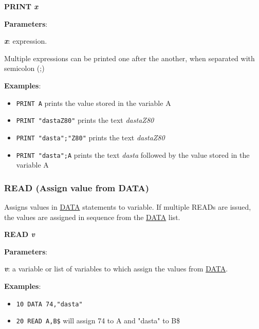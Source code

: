     \hspace{1.9cm}\textbf{PRINT \textit{x}}

    \textbf{Parameters}:

    \hspace{1cm}\textbf{\textit{x}}: expression.

    Multiple expressions can be printed one after the another, when separated
    with semicolon (;)

    \textbf{Examples}:
    \begin{itemize}
        \item \texttt{PRINT A} prints the value stored in the variable A
        \item \texttt{PRINT "dastaZ80"} prints the text \textit{dastaZ80}
        \item \texttt{PRINT "dasta";"Z80"} prints the text \textit{dastaZ80}
        \item \texttt{PRINT "dasta";A} prints the text \textit{dasta} followed
        by the value stored in the variable A
    \end{itemize}

    \subsubsection{{READ (Assign value from DATA)}}
    \label{msbasic:lang:read}
    Assigns values in \hyperref[msbasic:lang:data]{DATA} statements to variable.
    If multiple READs are issued, the values are assigned in sequence from the
    \hyperref[msbasic:lang:data]{DATA} list.

    \hspace{1.9cm}\textbf{READ \textit{v}}

    \textbf{Parameters}:

    \hspace{1cm}\textbf{\textit{v}}: a variable or list of variables to which
    assign the values from \hyperref[msbasic:lang:data]{DATA}.

    \textbf{Examples}:
    \begin{itemize}
        \item \texttt{10 DATA 74,"dasta"}
        \item \texttt{20 READ A,B\$} will assign 74 to A and "dasta" to B\$
    \end{itemize}

